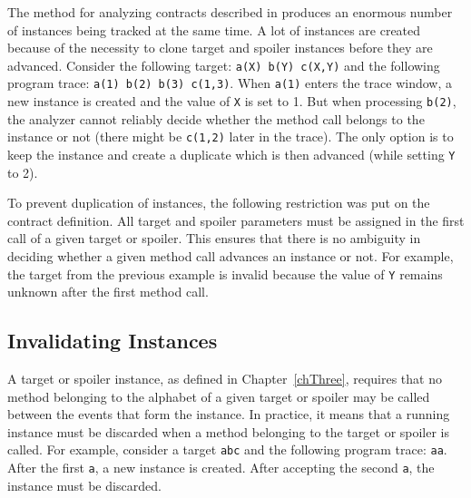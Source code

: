The method for analyzing contracts described in \cite{janousek} produces an
enormous number of instances being tracked at the same time. A lot of instances
are created because of the necessity to clone target and spoiler instances
before they are advanced. Consider the following target: \texttt{a(X) b(Y)
c(X,Y)} and the following program trace: \texttt{a(1) b(2) b(3) c(1,3)}.  When
\texttt{a(1)} enters the trace window, a new instance is created and the value
of \texttt{X} is set to 1. But when processing \texttt{b(2)}, the analyzer
cannot reliably decide whether the method call belongs to the instance or not
(there might be \texttt{c(1,2)} later in the trace). The only option is to keep
the instance and create a duplicate which is then advanced (while setting
\texttt{Y} to 2).

To prevent duplication of instances, the following restriction was put on the
contract definition. All target and spoiler parameters must be assigned in the
first call of a given target or spoiler. This ensures that there is no ambiguity
in deciding whether a given method call advances an instance or not. For
example, the target from the previous example is invalid because the value of
\texttt{Y} remains unknown after the first method call.

\subsection{Invalidating Instances}

A target or spoiler instance, as defined in Chapter~\ref{chThree}, requires that
no method belonging to the alphabet of a given target or spoiler may be called
between the events that form the instance. In practice, it means that a running
instance must be discarded when a method belonging to the target or spoiler is
called. For example, consider a target \texttt{abc} and the following program
trace: \texttt{aa}. After the first \texttt{a}, a new instance is created. After
accepting the second \texttt{a}, the instance must be discarded.

